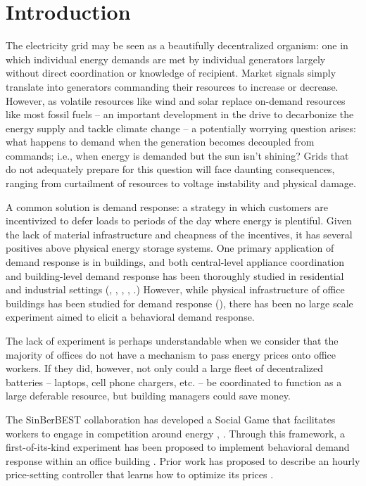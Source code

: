 \section{Introduction} \label{sec:intro}
The electricity grid may be seen as a beautifully decentralized organism: one in which individual energy demands are met by individual generators largely without direct coordination or knowledge of recipient. 
Market signals simply translate into generators commanding their resources to increase or decrease. 
However, as volatile resources like wind and solar replace on-demand resources like most fossil fuels 
-- an important development in the drive to decarbonize the energy supply and tackle climate change -- a potentially worrying question arises: what happens to demand when the generation becomes decoupled from commands; 
i.e., when energy is demanded but the sun isn't shining? 
Grids that do not adequately prepare for this question will face daunting consequences, 
ranging from curtailment of resources \citep{spangher2020prospective} to voltage instability and physical damage.  

A common solution is demand response: a strategy in which customers are incentivized to defer loads to periods of the day where energy is plentiful. 
Given the lack of material infrastructure and cheapness of the incentives, it has several positives above physical energy storage systems. 
One primary application of demand response is in buildings, and both central-level appliance coordination and building-level demand response has been thoroughly studied in residential and industrial settings
(\citep{asadinejad2018evaluation}, \citep{ma2015cooperative}, \citep{li2018integrating}, \citep{yoon2014dynamic}, \citep{johnson2015dynamic}.)
However, while physical infrastructure of office buildings has been studied for demand response (\citep{8248801}), 
there has been no large scale experiment aimed to elicit a behavioral demand response. 

The lack of experiment is perhaps understandable when we consider that the majority of offices do not have a mechanism to pass energy prices onto office workers\citep{das2019novel}. 
If they did, however, not only could a large fleet of decentralized batteries 
-- laptops, cell phone chargers, etc. -- 
be coordinated to function as a large deferable resource, 
but building managers could save money\citep{das2020occupants}.

The SinBerBEST collaboration has developed a Social Game that facilitates workers to engage in competition around energy \citep{konstantakopoulos2019deep}, \citep{konstantakopoulos2019design}. 
Through this framework, a first-of-its-kind experiment has been proposed to implement behavioral demand response within an office building \citep{spangher2020prospective}. 
Prior work has proposed to describe an hourly price-setting controller that learns how to optimize its prices \citep{spangher2020augmenting}. 

